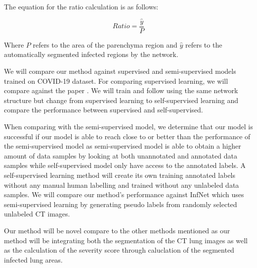 The equation for the ratio calculation is as follows:

\begin{equation}
Ratio = \frac{\hat{y}}{P}
\end{equation}

Where $P$ refers to the area of the parenchyma region and $\hat{y}$ refers to the automatically segmented infected regions by the network.

We will compare our method against supervised and semi-supervised \cite{ref13,ref14} models trained on COVID-19 dataset. For comparing supervised learning, we will compare against the paper \cite{ref13}. We will train and follow using the same network structure but change from supervised learning to self-supervised learning and compare the performance between supervised and self-supervised.

When comparing with the semi-supervised model, we determine that our model is successful if our model is able to reach close to or better than the performance of the semi-supervised model as semi-supervised model is able to obtain a higher amount of data samples by looking at both unannotated and annotated data samples while self-supervised model only have access to the annotated labels. A self-supervised learning method will create its own training annotated labels without any manual human labelling and trained without any unlabeled data samples. We will compare our method’s performance against InfNet \cite{ref14} which uses semi-supervised learning by generating pseudo labels from randomly selected unlabeled CT images.

Our method will be novel compare to the other methods mentioned as our method will be integrating both the segmentation of the CT lung images as well as the calculation of the severity score through caluclation of the segmented infected lung areas.

